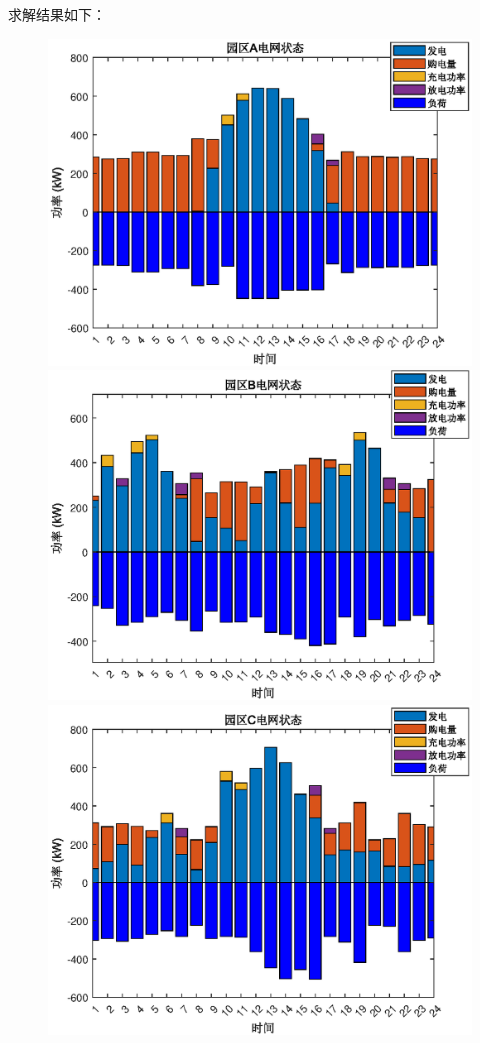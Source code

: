 \documentclass{cumcmthesis}
\begin{document}
求解结果如下：
\begin{figure}[!h]  
\centering  
\begin{minipage}{.5\textwidth}  
  \centering  
  \includegraphics[width=.9\linewidth]{figures/1_2_A.eps}  
\end{minipage}%
\begin{minipage}{.5\textwidth}  
  \centering  
  \includegraphics[width=.9\linewidth]{figures/1_2_B.eps}  
\end{minipage}  
\begin{minipage}{.5\textwidth}  
  \centering  
  \includegraphics[width=.9\linewidth]{figures/1_2_C.eps}  

\end{minipage}
\end{figure}
\end{document}
